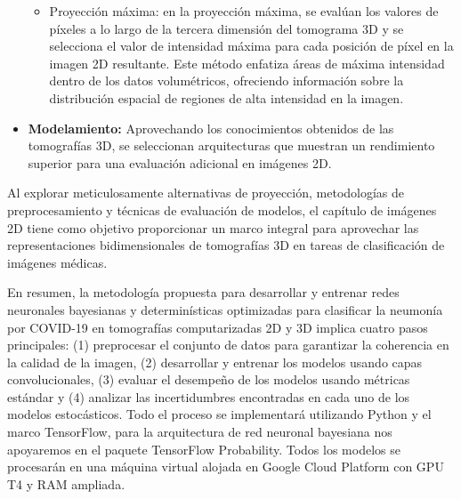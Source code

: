 \documentclass[10pt, oneside, a4paper]{article}
\begin{document}
\begin{itemize}
\begin{itemize}
			\item Proyección máxima: en la proyección máxima, se evalúan los valores de píxeles a lo largo de la tercera dimensión del tomograma 3D y se selecciona el valor de intensidad máxima para cada posición de píxel en la imagen 2D resultante. Este método enfatiza áreas de máxima intensidad dentro de los datos volumétricos, ofreciendo información sobre la distribución espacial de regiones de alta intensidad en la imagen.
		\end{itemize}
		
		\item \textbf{Modelamiento:} Aprovechando los conocimientos obtenidos de las tomografías 3D, se seleccionan arquitecturas que muestran un rendimiento superior para una evaluación adicional en imágenes 2D.
		
	\end{itemize} 

		Al explorar meticulosamente alternativas de proyección, metodologías de preprocesamiento y técnicas de evaluación de modelos, el capítulo de imágenes 2D tiene como objetivo proporcionar un marco integral para aprovechar las representaciones bidimensionales de tomografías 3D en tareas de clasificación de imágenes médicas.

	\par %
	\vspace{10pt} %

	\begin{minipage}{\linewidth}
	En resumen, la metodología propuesta para desarrollar y entrenar redes neuronales bayesianas y determinísticas optimizadas para clasificar la neumonía por COVID-19 en tomografías computarizadas 2D y 3D implica cuatro pasos principales: (1) preprocesar el conjunto de datos para garantizar la coherencia en la calidad de la imagen, (2) desarrollar y entrenar los modelos usando capas convolucionales, (3) evaluar el desempeño de los modelos usando métricas estándar y (4) analizar las incertidumbres encontradas en cada uno de los modelos estocásticos. Todo el proceso se implementará utilizando Python y el marco TensorFlow, para la arquitectura de red neuronal bayesiana nos apoyaremos en el paquete TensorFlow Probability. Todos los modelos se procesarán en una máquina virtual alojada en Google Cloud Platform con GPU T4 y RAM ampliada.
	\end{minipage}	



	
	
\end{document}
